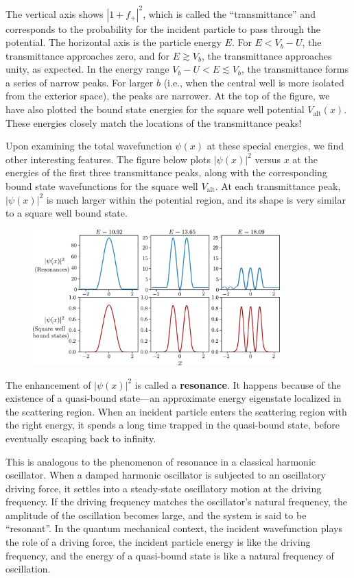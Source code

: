 \documentclass[pra,12pt]{revtex4}
\begin{document}
\noindent
The vertical axis shows $|1+f_+|^2$, which is called the
``transmittance'' and corresponds to the probability for the incident
particle to pass through the potential.  The horizontal axis is the
particle energy $E$.  For $E < V_b-U$, the transmittance approaches
zero, and for $E \gtrsim V_b$, the transmittance approaches unity, as
expected.  In the energy range $V_b-U < E \lesssim V_b$, the
transmittance forms a series of narrow peaks.  For larger $b$ (i.e.,
when the central well is more isolated from the exterior space), the
peaks are narrower.  At the top of the figure, we have also plotted
the bound state energies for the square well potential
$V_{\mathrm{alt}}(x)$.  These energies closely match the locations of
the transmittance peaks!

Upon examining the total wavefunction $\psi(x)$ at these special
energies, we find other interesting features.  The figure below plots
$|\psi(x)|^2$ versus $x$ at the energies of the first three
transmittance peaks, along with the corresponding bound state
wavefunctions for the square well $V_{\mathrm{alt}}$.  At each
transmittance peak, $|\psi(x)|^2$ is much larger within the potential
region, and its shape is very similar to a square well bound state.

\begin{figure}[h]
  \centering\includegraphics[width=0.85\textwidth]{resonancewavefunctions}
\end{figure}

\noindent
The enhancement of $|\psi(x)|^2$ is called a \textbf{resonance}.  It
happens because of the existence of a quasi-bound state---an
approximate energy eigenstate localized in the scattering region.
When an incident particle enters the scattering region with the right
energy, it spends a long time trapped in the quasi-bound state, before
eventually escaping back to infinity.

This is analogous to the phenomenon of resonance in a classical
harmonic oscillator.  When a damped harmonic oscillator is subjected
to an oscillatory driving force, it settles into a steady-state
oscillatory motion at the driving frequency.  If the driving frequency
matches the oscillator's natural frequency, the amplitude of the
oscillation becomes large, and the system is said to be ``resonant''.
In the quantum mechanical context, the incident wavefunction plays the
role of a driving force, the incident particle energy is like the
driving frequency, and the energy of a quasi-bound state is like a
natural frequency of oscillation.
\end{document}
